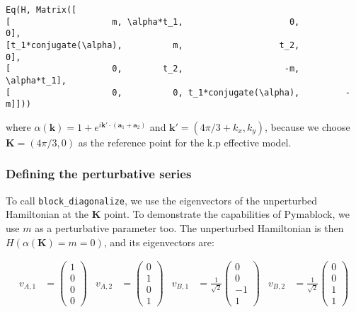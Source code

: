 \begin{verbatim}
Eq(H, Matrix([
[                    m, \alpha*t_1,                     0,          0],
[t_1*conjugate(\alpha),          m,                   t_2,          0],
[                    0,        t_2,                    -m, \alpha*t_1],
[                    0,          0, t_1*conjugate(\alpha),         -m]]))
\end{verbatim}

where $\alpha(\mathbf{k}) = 1 + e^{i \mathbf{k'} \cdot (\mathbf{a}_1 +
\mathbf{a}_2)}$ and $\mathbf{k'} = (4\pi/3 + k_x, k_y)$, because we choose
$\mathbf{K}=(4\pi/3, 0)$ as the reference point for the k.p effective model.

\subsubsection{Defining the perturbative series}


To call \texttt{block\_diagonalize}, we use the eigenvectors of the unperturbed
Hamiltonian at the $\mathbf{K}$ point.
To demonstrate the capabilities of Pymablock, we use $m$ as a perturbative
parameter too.
The unperturbed Hamiltonian is then $H(\alpha(\mathbf{K}) = m = 0)$, and its
eigenvectors are:

\begin{align}
v_{A,1} &= \begin{pmatrix} 1 \\ 0 \\ 0 \\ 0 \end{pmatrix} &
v_{A,2} &= \begin{pmatrix} 0 \\ 1 \\ 0 \\ 1 \end{pmatrix} &
v_{B,1} &= \frac{1}{\sqrt{2}} \begin{pmatrix} 0 \\ 0 \\ -1 \\ 1 \end{pmatrix} &
v_{B,2} &= \frac{1}{\sqrt{2}} \begin{pmatrix} 0 \\ 0 \\ 1 \\ 1 \end{pmatrix}
\end{align}

